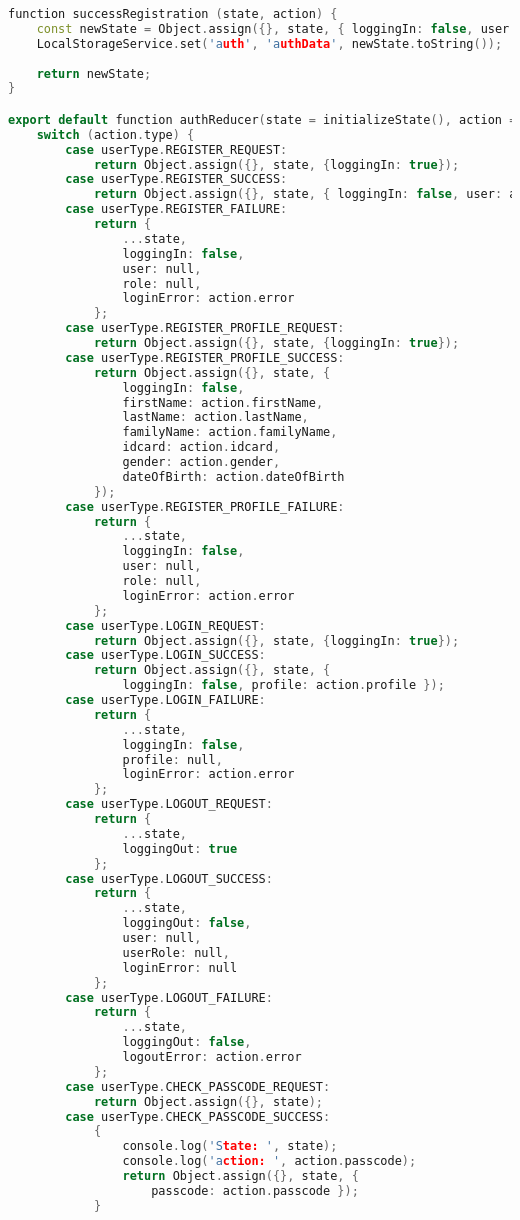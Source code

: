 \begin{lstlisting}[language=C++, style=cplusplusstyle]
function successRegistration (state, action) {
    const newState = Object.assign({}, state, { loggingIn: false, user: action.user, role: action.role });
    LocalStorageService.set('auth', 'authData', newState.toString());
    
    return newState;
}

export default function authReducer(state = initializeState(), action = {}) {
    switch (action.type) {
        case userType.REGISTER_REQUEST:
            return Object.assign({}, state, {loggingIn: true});
        case userType.REGISTER_SUCCESS:
            return Object.assign({}, state, { loggingIn: false, user: action.user, role: action.role });
        case userType.REGISTER_FAILURE:
            return {
                ...state,
                loggingIn: false,
                user: null,
                role: null,
                loginError: action.error
            };
        case userType.REGISTER_PROFILE_REQUEST:
            return Object.assign({}, state, {loggingIn: true});
        case userType.REGISTER_PROFILE_SUCCESS:
            return Object.assign({}, state, {
                loggingIn: false,
                firstName: action.firstName,
                lastName: action.lastName,
                familyName: action.familyName,
                idcard: action.idcard,
                gender: action.gender,
                dateOfBirth: action.dateOfBirth
            });
        case userType.REGISTER_PROFILE_FAILURE:
            return {
                ...state,
                loggingIn: false,
                user: null,
                role: null,
                loginError: action.error
            };
        case userType.LOGIN_REQUEST:
            return Object.assign({}, state, {loggingIn: true});
        case userType.LOGIN_SUCCESS:
            return Object.assign({}, state, {
                loggingIn: false, profile: action.profile });
        case userType.LOGIN_FAILURE:
            return {
                ...state,
                loggingIn: false,
                profile: null,
                loginError: action.error
            };
        case userType.LOGOUT_REQUEST:
            return {
                ...state,
                loggingOut: true
            };
        case userType.LOGOUT_SUCCESS:
            return {
                ...state,
                loggingOut: false,
                user: null,
                userRole: null,
                loginError: null
            };
        case userType.LOGOUT_FAILURE:
            return {
                ...state,
                loggingOut: false,
                logoutError: action.error
            };
        case userType.CHECK_PASSCODE_REQUEST:
            return Object.assign({}, state);
        case userType.CHECK_PASSCODE_SUCCESS:
            {
                console.log('State: ', state);
                console.log('action: ', action.passcode);
                return Object.assign({}, state, {
                    passcode: action.passcode });
            }
            

\end{lstlisting}
